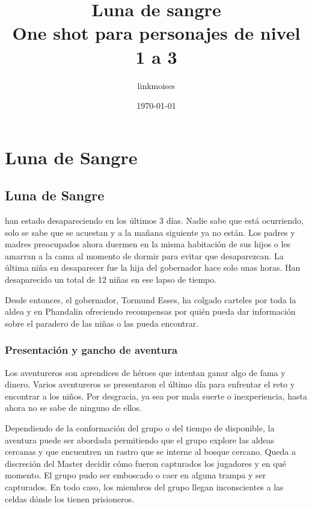 \documentclass[10pt,twoside,twocolumn,openany]{dndbook}
\title{Luna de sangre\\
\large One shot para personajes de nivel 1 a 3}
\author{linkmoises}
\date{\today}
\begin{document}
\frontmatter

\maketitle

\mainmatter

\part*{Luna de Sangre}

\chapter*{Luna de Sangre}

 han estado desapareciendo en los 
últimos 3 días. Nadie sabe que está ocurriendo, solo se sabe que se acuestan y a la mañana 
siguiente ya no están. Los padres y madres preocupados ahora duermen en la misma habitación de
sus hijos o les amarran a la cama al momento de dormir para evitar que desaparezcan. La última 
niña en desaparecer fue la hija del gobernador hace solo unas horas. Han desaparecido un total de 
12 niñas en ese lapso de tiempo.

Desde entonces, el gobernador, Tormund Esses, ha colgado carteles por toda la aldea y en Phandalin 
ofreciendo recompensas por quién pueda dar información sobre el paradero de las niñas o las pueda 
encontrar.

\section{Presentación y gancho de aventura}

Los aventureros son aprendices de héroes que intentan ganar algo de fama y dinero. Varios aventureros 
se presentaron el último día para enfrentar el reto y encontrar a los niños. Por desgracia, ya sea 
por mala suerte o inexperiencia, hasta ahora no se sabe de ninguno de ellos.

Dependiendo de la conformación del grupo o del tiempo de disponible, la aventura puede ser abordada
permitiendo que el grupo explore las aldeas cercanas y que encuentren un rastro que se interne al 
bosque cercano. Queda a discreción del Master decidir cómo fueron capturados los jugadores y en qué 
momento. El grupo pudo ser emboscado o caer en alguna trampa y ser capturados. En todo caso,
los miembros del grupo llegan inconscientes a las celdas dónde los tienen prisioneros.
\end{document}
